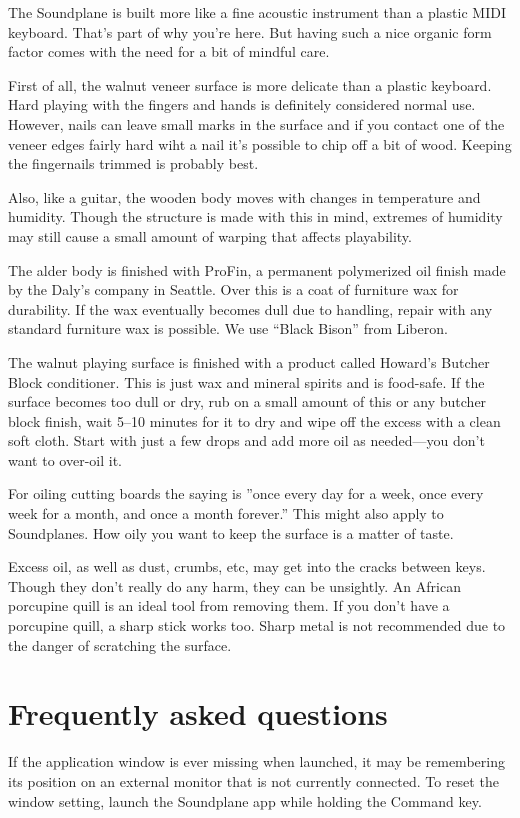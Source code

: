 The Soundplane is built more like a fine acoustic instrument than a plastic MIDI keyboard.  That's part of why you're here.  But having such a nice organic form factor comes with the need for a bit of mindful care.  

First of all, the walnut veneer surface is more delicate than a plastic keyboard.  Hard playing with the fingers and hands is definitely considered normal use.  However, nails can leave small marks in the surface and if you contact one of the veneer edges fairly hard wiht a nail it's possible to chip off a bit of wood.  Keeping the fingernails trimmed is probably best.  

Also, like a guitar, the wooden body moves with changes in temperature and humidity.  Though the structure is made with this in mind, extremes of humidity may still cause a small amount of warping that affects playability.  

The alder body is finished with ProFin, a permanent polymerized oil finish made by the Daly’s company in Seattle.  Over this is a coat of furniture wax for durability.  If the wax eventually becomes dull due to handling, repair with any standard furniture wax is possible.  We use “Black Bison” from Liberon.  

The walnut playing surface is finished with a product called Howard’s Butcher Block conditioner.  This is just wax and mineral spirits and is food-safe.  If the surface becomes too dull or dry, rub on a small amount of this or any butcher block finish, wait 5–10 minutes for it to dry and wipe off the excess with a clean soft cloth.  Start with just a few drops and add more oil as needed—you don't want to over-oil it.  

For oiling cutting boards the saying is ”once every day for a week, once every week for a month, and once a month forever.”  This might also apply to Soundplanes.  How oily you want to keep the surface is a matter of taste.  

Excess oil, as well as dust, crumbs, etc, may get into the cracks between keys.  Though they don't really do any harm, they can be unsightly.  An African porcupine quill is an ideal tool from removing them.  If you don't have a porcupine quill, a sharp stick works too.  Sharp metal is not recommended due to the danger of scratching the surface. 


\appendix

\chapter{Frequently asked questions}

If the application window is ever missing when launched, it may be remembering its position on an external monitor that is not currently connected. To reset the window setting, launch the Soundplane app while holding the Command key. 




\printindex




